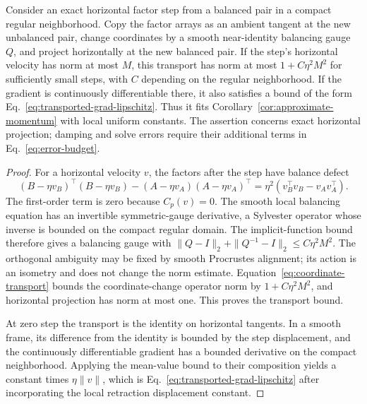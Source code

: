 \begin{proposition}
\label{prop:implemented-transport}
Consider an exact horizontal factor step from a balanced pair in a compact
regular neighborhood. Copy the factor arrays as an ambient tangent at
the new unbalanced pair, change coordinates by a smooth near-identity
balancing gauge $Q$, and project horizontally at the new balanced pair.
If the step's horizontal velocity has norm at most $M$, this transport
has norm at most $1+C\eta^2M^2$ for sufficiently small steps, with
$C$ depending on the regular neighborhood. If the gradient is continuously
differentiable there, it also satisfies a bound of the form
Eq.~\eqref{eq:transported-grad-lipschitz}. Thus it fits
Corollary~\ref{cor:approximate-momentum} with local uniform constants.
The assertion concerns exact horizontal projection; damping and solve
errors require their additional terms in Eq.~\eqref{eq:error-budget}.
\end{proposition}
\begin{proof}
For a horizontal velocity $v$, the factors after the step have balance
defect
\begin{equation}
 (B-\eta v_B)^\top(B-\eta v_B)
 -(A-\eta v_A)(A-\eta v_A)^\top
 =\eta^2(v_B^\top v_B-v_Av_A^\top).
\end{equation}
The first-order term is zero because $C_p(v)=0$. The smooth local
balancing equation has an invertible symmetric-gauge derivative, a
Sylvester operator whose inverse is bounded on the compact regular
domain. The implicit-function bound therefore gives a balancing gauge
with $\|Q-I\|_2+\|Q^{-1}-I\|_2\leq C\eta^2M^2$.
The orthogonal ambiguity may be fixed by smooth Procrustes alignment;
its action is an isometry and does not change the norm estimate.
Equation~\eqref{eq:coordinate-transport} bounds the coordinate-change
operator norm by $1+C\eta^2M^2$, and horizontal projection has norm at
most one. This proves the transport bound.

At zero step the transport is the identity on horizontal tangents.
In a smooth frame, its difference from the identity is bounded by the
step displacement, and the continuously differentiable gradient has a
bounded derivative on the compact neighborhood. Applying the mean-value
bound to their composition yields a constant times
$\eta\|v\|$, which is Eq.~\eqref{eq:transported-grad-lipschitz}
after incorporating the local retraction displacement constant.
\end{proof}

